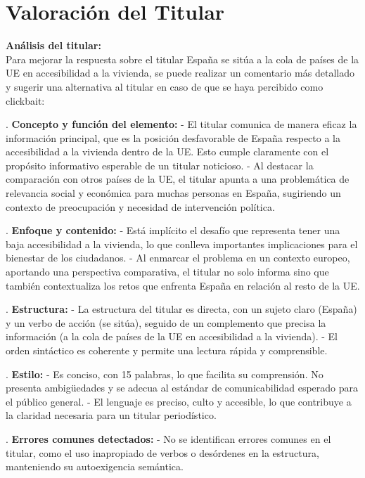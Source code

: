 \documentclass[10pt,a4paper]{article}
\begin{document}
\section*{Valoración del Titular}
        \textbf{Análisis del titular:} \\ 
        Para mejorar la respuesta sobre el titular {}Espa\~{n}a se sit\'{u}a a la cola de pa\'{i}ses de la UE en accesibilidad a la vivienda{}, se puede realizar un comentario m\'{a}s detallado y sugerir una alternativa al titular en caso de que se haya percibido como clickbait:
\par{}. \textbf{Concepto y funci\'{o}n del elemento:}    - El titular comunica de manera eficaz la informaci\'{o}n principal, que es la posici\'{o}n desfavorable de Espa\~{n}a respecto a la accesibilidad a la vivienda dentro de la UE. Esto cumple claramente con el prop\'{o}sito informativo esperable de un titular noticioso.    - Al destacar la comparaci\'{o}n con otros pa\'{i}ses de la UE, el titular apunta a una problem\'{a}tica de relevancia social y econ\'{o}mica para muchas personas en Espa\~{n}a, sugiriendo un contexto de preocupaci\'{o}n y necesidad de intervenci\'{o}n pol\'{i}tica.
\par{}. \textbf{Enfoque y contenido:}    - Est\'{a} impl\'{i}cito el desaf\'{i}o que representa tener una baja accesibilidad a la vivienda, lo que conlleva importantes implicaciones para el bienestar de los ciudadanos.    - Al enmarcar el problema en un contexto europeo, aportando una perspectiva comparativa, el titular no solo informa sino que tambi\'{e}n contextualiza los retos que enfrenta Espa\~{n}a en relaci\'{o}n al resto de la UE.
\par{}. \textbf{Estructura:}    - La estructura del titular es directa, con un sujeto claro (Espa\~{n}a) y un verbo de acci\'{o}n (se sit\'{u}a), seguido de un complemento que precisa la informaci\'{o}n (a la cola de pa\'{i}ses de la UE en accesibilidad a la vivienda).    - El orden sint\'{a}ctico es coherente y permite una lectura r\'{a}pida y comprensible.
\par{}. \textbf{Estilo:}    - Es conciso, con 15 palabras, lo que facilita su comprensi\'{o}n. No presenta ambig\"{u}edades y se adecua al est\'{a}ndar de comunicabilidad esperado para el p\'{u}blico general.    - El lenguaje es preciso, culto y accesible, lo que contribuye a la claridad necesaria para un titular period\'{i}stico.
\par{}. \textbf{Errores comunes detectados:}    - No se identifican errores comunes en el titular, como el uso inapropiado de verbos o des\'{o}rdenes en la estructura, manteniendo su autoexigencia sem\'{a}ntica.
\end{document}
